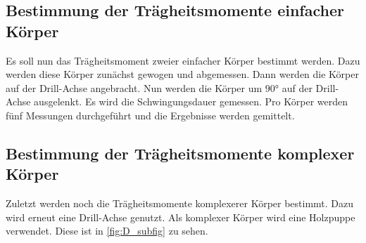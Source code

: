 \subsection{Bestimmung der Trägheitsmomente einfacher Körper}
\label{subsec:D_Körper}
Es soll nun das Trägheitsmoment zweier einfacher Körper bestimmt werden. Dazu werden diese Körper zunächst gewogen und abgemessen. Dann werden die Körper auf der Drill-Achse angebracht. Nun werden
die Körper um $90\unit{\degree}$ auf der Drill-Achse ausgelenkt. Es wird die Schwingungsdauer gemessen. Pro Körper werden fünf Messungen durchgeführt und die Ergebnisse werden gemittelt.
\subsection{Bestimmung der Trägheitsmomente komplexer Körper}
\label{subsec:D_Figur}
Zuletzt werden noch die Trägheitsmomente komplexerer Körper bestimmt. Dazu wird erneut eine Drill-Achse genutzt. Als komplexer Körper wird eine Holzpuppe verwendet. Diese ist in \autoref{fig:D_subfig} zu sehen.

